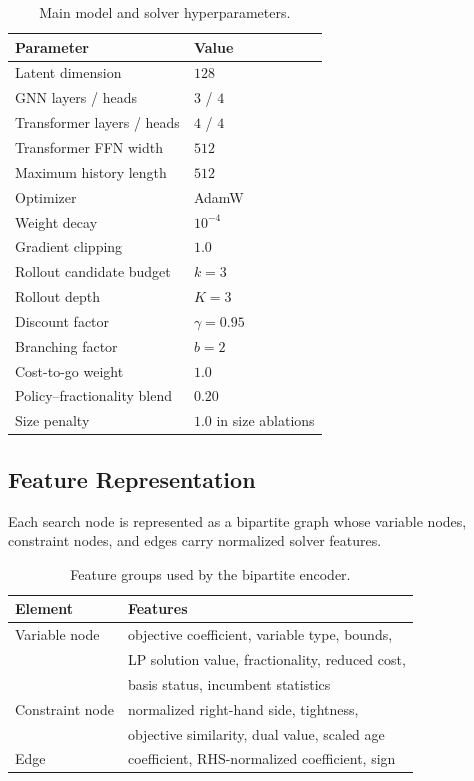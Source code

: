 \documentclass{article}
\begin{document}
\begin{table}[!h]
\centering
\caption{Main model and solver hyperparameters.}
\label{tab:hyperparameters}
\begin{tabular}{ll}
\toprule
Parameter & Value \\
\midrule
Latent dimension & $128$ \\
GNN layers / heads & $3$ / $4$ \\
Transformer layers / heads & $4$ / $4$ \\
Transformer FFN width & $512$ \\
Maximum history length & $512$ \\
Optimizer & AdamW \\
Weight decay & $10^{-4}$ \\
Gradient clipping & $1.0$ \\
Rollout candidate budget & $k=3$ \\
Rollout depth & $K=3$ \\
Discount factor & $\gamma=0.95$ \\
Branching factor & $b=2$ \\
Cost-to-go weight & $1.0$ \\
Policy--fractionality blend & $0.20$ \\
Size penalty & $1.0$ in size ablations \\
\bottomrule
\end{tabular}
\end{table}

\subsection{Feature Representation}
\label{app:features}

Each search node is represented as a bipartite graph whose variable nodes, constraint nodes, and edges carry normalized solver features.

\begin{table}[!h]
\centering
\caption{Feature groups used by the bipartite encoder.}
\label{tab:feature-groups}
\begin{tabular}{ll}
\toprule
Element & Features \\
\midrule
Variable node & objective coefficient, variable type, bounds, \\
& LP solution value, fractionality, reduced cost, \\
& basis status, incumbent statistics \\
Constraint node & normalized right-hand side, tightness, \\
& objective similarity, dual value, scaled age \\
Edge & coefficient, RHS-normalized coefficient, sign \\
\bottomrule
\end{tabular}
\end{table}
\end{document}
